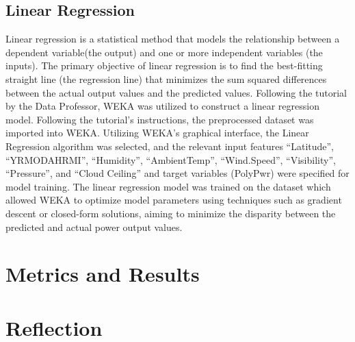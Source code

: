 \documentclass[10pt,twocolumn]{article}
\begin{document}
\subsection{Linear Regression }
Linear regression is a statistical method that models the relationship between a dependent variable(the output) and one or more independent variables (the inputs). The primary objective of linear regression is to find the best-fitting straight line (the regression line) that minimizes the sum squared differences between the actual output values and the predicted values. Following the tutorial by the Data Professor,  WEKA was utilized to construct a linear regression model.  Following the tutorial’s instructions,  the preprocessed dataset was imported into WEKA. Utilizing WEKA's graphical interface, the Linear Regression algorithm was selected, and the relevant input features “Latitude”, “YRMODAHRMI”, “Humidity”, “AmbientTemp”, “Wind.Speed”, “Visibility”, “Pressure”, and “Cloud Ceiling” and target variables (PolyPwr) were specified for model training. The linear regression model was trained on the dataset which allowed WEKA to optimize model parameters using techniques such as gradient descent or closed-form solutions, aiming to minimize the disparity between the predicted and actual power output values. 



\section{Metrics and Results}
\section{Reflection }

\printbibliography
\end{document}
